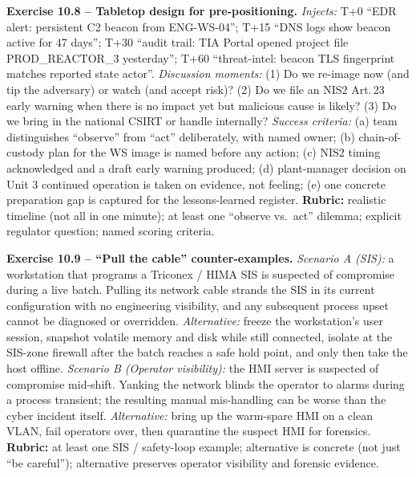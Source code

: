 \documentclass[11pt,a4paper]{article}
\begin{document}
\begin{solutionbox}
\textbf{Exercise 10.8 -- Tabletop design for pre-positioning.}
\textit{Injects:} T+0 ``EDR alert: persistent C2 beacon from
ENG-WS-04''; T+15 ``DNS logs show beacon active for 47 days''; T+30 ``audit
trail: TIA Portal opened project file PROD\_REACTOR\_3 yesterday''; T+60
``threat-intel: beacon TLS fingerprint matches reported state actor''.
\textit{Discussion moments:} (1) Do we re-image now (and tip the adversary)
or watch (and accept risk)? (2) Do we file an NIS2 Art.\,23 early warning
when there is no impact yet but malicious cause is likely? (3) Do we bring
in the national CSIRT or handle internally? \textit{Success criteria:}
(a) team distinguishes ``observe'' from ``act'' deliberately, with named
owner; (b) chain-of-custody plan for the WS image is named before any
action; (c) NIS2 timing acknowledged and a draft early warning produced;
(d) plant-manager decision on Unit 3 continued operation is taken on
evidence, not feeling; (e) one concrete preparation gap is captured for the
lessons-learned register. \textbf{Rubric:} realistic timeline (not all in
one minute); at least one ``observe vs.\ act'' dilemma; explicit regulator
question; named scoring criteria.
\end{solutionbox}

\begin{solutionbox}
\textbf{Exercise 10.9 -- ``Pull the cable'' counter-examples.}
\textit{Scenario A (SIS):} a workstation that programs a Triconex / HIMA SIS
is suspected of compromise during a live batch. Pulling its network cable
strands the SIS in its current configuration with no engineering visibility,
and any subsequent process upset cannot be diagnosed or overridden.
\emph{Alternative:} freeze the workstation's user session, snapshot
volatile memory and disk while still connected, isolate at the SIS-zone
firewall after the batch reaches a safe hold point, and only then take the
host offline. \textit{Scenario B (Operator visibility):} the HMI server is
suspected of compromise mid-shift. Yanking the network blinds the operator
to alarms during a process transient; the resulting manual mis-handling can
be worse than the cyber incident itself. \emph{Alternative:} bring up the
warm-spare HMI on a clean VLAN, fail operators over, then quarantine the
suspect HMI for forensics. \textbf{Rubric:} at least one SIS / safety-loop
example; alternative is concrete (not just ``be careful''); alternative
preserves operator visibility and forensic evidence.
\end{solutionbox}
\end{document}
